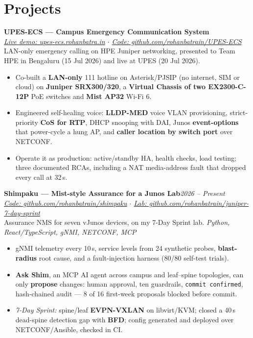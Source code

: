 \documentclass[10pt,a4paper]{article}
\newcommand{\entry}[3]{%
  \textbf{#1}\hfill\textit{\small #2}\\[-0.15em]
  {\small #3}\par\vspace{0.08em}%
}
\begin{document}
\section{Projects}
\entry{UPES-ECS --- Campus Emergency Communication System}{}{\textit{\href{https://upes-ecs.rohanbatra.in}{Live demo: upes-ecs.rohanbatra.in} \;$\cdot$\; \href{https://github.com/rohanbatrain/UPES-ECS}{Code: github.com/rohanbatrain/UPES-ECS}}\\ LAN-only emergency calling on HPE Juniper networking, presented to Team HPE in Bengaluru (15 Jul 2026) and live at UPES (20 Jul 2026).}
\begin{itemize}
  \item Co-built a \textbf{LAN-only} 111 hotline on Asterisk/PJSIP (no internet, SIM or cloud) on \textbf{Juniper SRX300/320}, a \textbf{Virtual Chassis of two EX2300-C-12P} PoE switches and \textbf{Mist AP32} Wi-Fi 6.
  \item Engineered self-healing voice: \textbf{LLDP-MED} voice VLAN provisioning, strict-priority \textbf{CoS for RTP}, DHCP snooping with DAI, Junos \textbf{event-options} that power-cycle a hung AP, and \textbf{caller location by switch port} over NETCONF.
  \item Operate it as production: active/standby HA, health checks, load testing; three documented RCAs, including a NAT media-address fault that dropped every call at 32\,s.
\end{itemize}

\entry{Shimpaku --- Mist-style Assurance for a Junos Lab}{2026 -- Present}{\textit{\href{https://github.com/rohanbatrain/shimpaku}{Code: github.com/rohanbatrain/shimpaku} \;$\cdot$\; \href{https://github.com/rohanbatrain/juniper-7-day-sprint}{Lab: github.com/rohanbatrain/juniper-7-day-sprint}}\\ Assurance NMS for seven vJunos devices, on my 7-Day Sprint lab. \textit{Python, React/TypeScript, gNMI, NETCONF, MCP}}
\begin{itemize}
  \item gNMI telemetry every 10\,s, service levels from 24 synthetic probes, \textbf{blast-radius} root cause, and a fault-injection harness (80/80 self-test trials).
  \item \textbf{Ask Shim}, an MCP AI agent across campus and leaf--spine topologies, can only \textbf{propose} changes: human approval, ten guardrails, \texttt{commit confirmed}, hash-chained audit --- 8 of 16 first-week proposals blocked before commit.
  \item \textit{7-Day Sprint:} spine/leaf \textbf{EVPN-VXLAN} on libvirt/KVM; closed a 40\,s dead-spine detection gap with \textbf{BFD}; config generated and deployed over NETCONF/Ansible, checked in CI.
\end{itemize}
\end{document}
